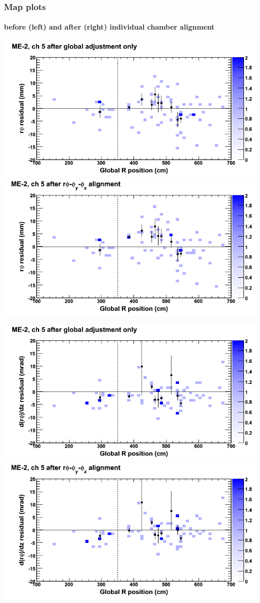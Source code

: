 \documentclass[compress]{beamer}
\begin{document}
\begin{frame}
\frametitle{Map plots}
\framesubtitle{before (left) and after (right) individual chamber alignment}
\includegraphics[width=0.5\linewidth]{ringmapplots_3dof/before_CSCvsr_mem2ch05_x.png} \includegraphics[width=0.5\linewidth]{ringmapplots_3dof/after_CSCvsr_mem2ch05_x.png}

\includegraphics[width=0.5\linewidth]{ringmapplots_3dof/before_CSCvsr_mem2ch05_dxdz.png} \includegraphics[width=0.5\linewidth]{ringmapplots_3dof/after_CSCvsr_mem2ch05_dxdz.png}
\end{frame}
\end{document}
